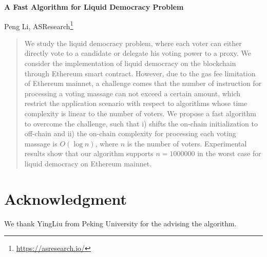 \documentclass[12pt]{article}
\begin{document}
	\pagestyle{empty}

	\begin{center}
		\vspace*{1.5cm}
		\vspace{0.5cm}
		\textbf{\huge{A Fast Algorithm for Liquid Democracy Problem}}

		\vspace{0.5cm}
    Peng Li, ASResearch\footnote{\url{https://asresearch.io/}}
		\textbf{}
	\end{center}
\begin{abstract}
	We study the liquid democracy problem, where each voter can either directly vote to a candidate or delegate his voting power to a proxy. We consider the implementation of liquid democracy on the blockchain through Ethereum smart contract. However, due to the gas fee limitation of Ethereum mainnet, a challenge comes that the number of instruction for processing a voting massage can not exceed a certain amount, which restrict the application scenario with respect to algorithms whose time complexity is linear to the number of voters. We propose a fast algorithm to overcome the challenge, such that i) shifts the on-chain initialization to off-chain and ii) the on-chain complexity for processing each voting massage is $O(\log n)$, where $n$ is the number of voters. Experimental results show that our algorithm supports $n=1000000$ in the worst case for liquid democracy on Ethereum mainnet. 
\end{abstract}






\section*{Acknowledgment}
We thank YingLiu from Peking University for the advising the algorithm.



\end{document}
